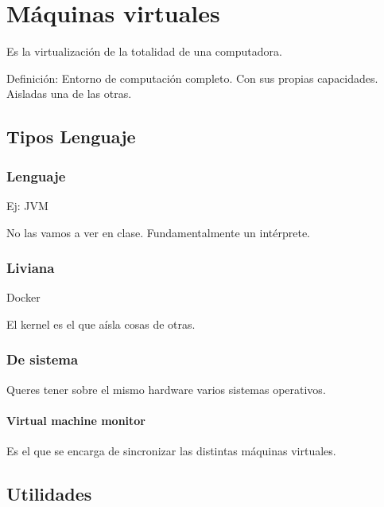 \documentclass{article}
\begin{document}
\section{Máquinas virtuales}\label{muxe1quinas-virtuales}

Es la virtualización de la totalidad de una computadora.

Definición: Entorno de computación completo. Con sus propias
capacidades. Aisladas una de las otras.

\subsection{Tipos Lenguaje}\label{tipos-lenguaje}

\subsubsection{Lenguaje}\label{lenguaje}

Ej: JVM

No las vamos a ver en clase. Fundamentalmente un intérprete.

\subsubsection{Liviana}\label{liviana}

Docker

El kernel es el que aísla cosas de otras.

\subsubsection{De sistema}\label{de-sistema}

Queres tener sobre el mismo hardware varios sistemas operativos.

\paragraph{Virtual machine monitor}\label{virtual-machine-monitor}

Es el que se encarga de sincronizar las distintas máquinas virtuales.

\subsection{Utilidades}\label{utilidades}
\end{document}
